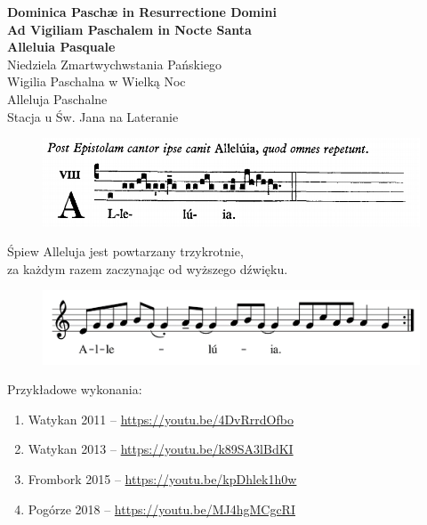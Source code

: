 \documentclass[10pt,oneside,final,notitlepage,a4paper,wide]{mwart}
\begin{document}
%
\begin{center}
	\LARGE{\textbf{Dominica Paschæ in Resurrectione Domini\\Ad Vigiliam Paschalem in Nocte Santa\\Alleluia Pasquale}}\\ \smallskip
	\small{Niedziela Zmartwychwstania Pańskiego\\Wigilia Paschalna w Wielką Noc\\Alleluja Paschalne\\ \smallskip Stacja u Św. Jana na Lateranie}
\vspace{1cm}

	\begin{figure}[h]
		\includegraphics[width=\textwidth]{Alleluia_Choral.png}
	\end{figure}
	\large{Śpiew Alleluja jest powtarzany trzykrotnie,\\za każdym razem zaczynając od wyższego dźwięku.}
	\begin{figure}[h]
		\includegraphics{Alleluia_notes.png}
	\end{figure}
\end{center}
\bigskip

Przykładowe wykonania:
	\begin{enumerate}[label=\alph*), leftmargin=1cm]
		\item Watykan 2011 -- \href{https://youtu.be/4DvRrrdOfbo}{https://youtu.be/4DvRrrdOfbo}
		\item Watykan 2013 -- \href{https://youtu.be/k89SA3lBdKI}{https://youtu.be/k89SA3lBdKI}
		\item Frombork 2015 -- \href{https://youtu.be/kpDhlek1h0w}{https://youtu.be/kpDhlek1h0w}
		\item Pogórze 2018 -- \href{https://youtu.be/MJ4hgMCgcRI}{https://youtu.be/MJ4hgMCgcRI}	
	\end{enumerate}
\end{document}
